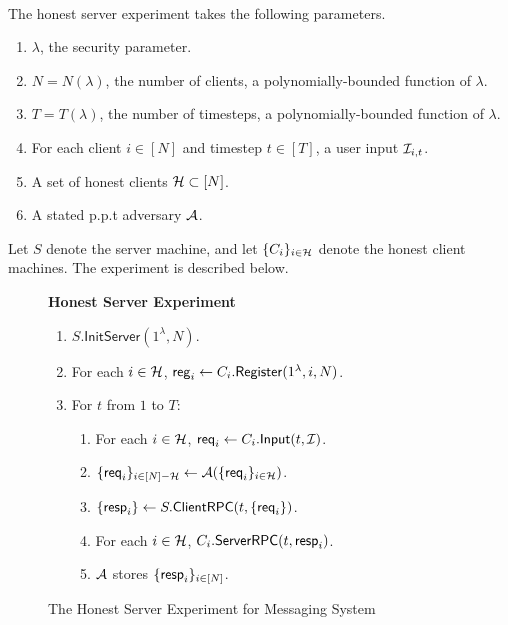 \begin{definition}  \hfill\\
\label{defn:messaging-honest-server-experiment}
The honest server experiment takes the following parameters.

\begin{enumerate}
    \item $\lambda$, the security parameter.
    \item $N = N(\lambda)$, the number of clients, a polynomially-bounded function of $\lambda$.
    \item $T = T(\lambda)$, the number of timesteps, a polynomially-bounded function of $\lambda$.
    \item For each client $i \in [N]$ and timestep $t \in [T]$, a user input $\mathcal{I}_{i, t}$.
    \item A set of honest clients $\mathcal{H} \subset [N]$.
    \item A stated p.p.t adversary $\mathcal{A}$.
\end{enumerate}

Let $S$ denote the server machine, and let $\{C_i\}_{i \in \mathcal{H}}$ denote the honest client machines. The experiment is described below.
\begin{figure}[ht!]
\begin{framed}
\textbf{Honest Server Experiment}
\begin{enumerate}
\item $S.\mathsf{InitServer}(1^{\lambda}, N)$. 
\item For each $i \in \mathcal{H}$, $\mathsf{reg}_i \leftarrow C_i.\mathsf{Register}(1^{\lambda}, i, N)$. 
\item For $t$ from $1$ to $T$:
    \begin{enumerate}
    \item For each $i \in \mathcal{H}$, $\mathsf{req}_i \leftarrow C_i.\mathsf{Input}(t, \mathcal{I})$.

    \item $\{\mathsf{req}_i\}_{i \in [N] - \mathcal{H}} \leftarrow \mathcal{A}(\{\mathsf{req}_i\}_{i \in \mathcal{H}})$.
    
    \item $\{\mathsf{resp}_i\} \leftarrow S.\mathsf{ClientRPC}(t, \{\mathsf{req}_i\})$.
    
    \item For each $i \in \mathcal{H}$, $C_i.\mathsf{ServerRPC}(t, \mathsf{resp}_i)$.

    \item $\mathcal{A}$ stores $\{\mathsf{resp}_i\}_{i \in [N]}$.
    \end{enumerate}
\end{enumerate}
\end{framed}
\caption{The Honest Server Experiment for Messaging System}
\label{expr:messaging-honest-server}
\end{figure}

\end{definition}

